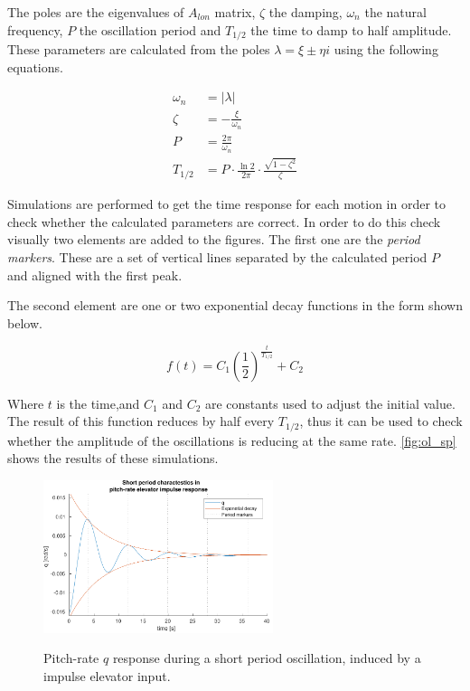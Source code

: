 The poles are the eigenvalues of $A_{lon}$ matrix, $\zeta$ the damping, $\omega_n$ the natural frequency, $P$ the oscillation period and $T_{1/2}$ the time to damp to half amplitude. These parameters are calculated from the poles $\lambda =\xi \pm \eta i$ using the following equations.

\begin{align}
    \omega_n&=\left | \lambda\right | \\
    \zeta&=-\frac{\xi}{\omega_n} \\
    P&=\frac{2\pi}{\omega_n} \\
    T_{1/2}&=P \cdot \frac{\ln{2}}{2 \pi} \cdot \frac{\sqrt{1-\zeta^2}}{\zeta}
\end{align}

Simulations are performed to get the time response for each motion in order to check whether the calculated parameters are correct. In order to do this check visually two elements are added to the figures. The first one are the \emph{period markers}. These are a set of vertical lines separated by the calculated period $P$ and aligned with the first peak.

The second element are one or two exponential decay functions in the form shown below.

\begin{equation}
    f(t) = C_1\left(\frac{1}{2}\right)^{\frac{t}{T_{1/2}}} + C_2
\end{equation}

Where $t$ is the time,and $C_1$ and $C_2$ are constants used to adjust the initial value. The result of this function reduces by half every $T_{1/2}$, thus it can be used to check whether the amplitude of the oscillations is reducing at the same rate. \autoref{fig:ol_sp} shows the results of these simulations.

\begin{figure}[ht]
    \centering
    \includegraphics[width=0.6\textwidth]{figures/ol_sp}
    \label{fig:ol_sp}
    \caption{Pitch-rate $q$ response during a short period oscillation, induced by a impulse elevator input.}
\end{figure}

